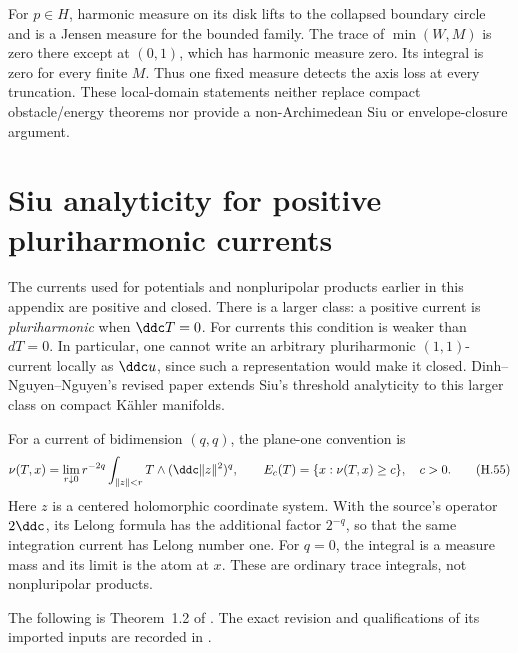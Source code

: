 For $p\in H$, harmonic measure on its disk lifts to the collapsed
boundary circle and is a Jensen measure for the bounded family.
The trace of $\min(W,M)$ is zero there except at $(0,1)$, which has
harmonic measure zero. Its integral is zero for every finite $M$.
Thus one fixed measure detects the axis loss at every truncation.
These local-domain statements neither replace compact obstacle/energy
theorems nor provide a non-Archimedean Siu or envelope-closure argument.

\section{Siu analyticity for positive pluriharmonic currents}
\label{sec:appH-pluriharmonic-Siu}

The currents used for potentials and nonpluripolar products earlier in
this appendix are positive and closed. There is a larger class:
a positive current is \emph{pluriharmonic} when $\ddc T=0$.
For currents this condition is weaker than $dT=0$. In particular,
one cannot write an arbitrary pluriharmonic $(1,1)$-current locally
as $\ddc u$, since such a representation would make it closed.
Dinh--Nguyen--Nguyen's revised paper
\cite{DinhNguyenNguyen26SiuV2} extends Siu's threshold analyticity
to this larger class on compact K\"ahler manifolds.

For a current of bidimension $(q,q)$, the plane-one convention is
\begin{equation*}
 \nu(T,x)=\lim_{r\downarrow0}r^{-2q}
       \int_{\|z\|<r}T\wedge(\ddc\|z\|^2)^q,
 \qquad E_c(T)=\{x:\nu(T,x)\geq c\},\quad c>0.
\tag{H.55}\label{eq:appH-PH-Lelong}
\end{equation*}
Here $z$ is a centered holomorphic coordinate system. With the source's
operator $2\ddc$, its Lelong formula has the additional factor $2^{-q}$,
so that the same integration current has Lelong number one.
For $q=0$, the integral is a measure mass and its limit is the atom
at $x$. These are ordinary trace integrals, not nonpluripolar products.

The following is Theorem~1.2 of
\cite[actual p.~2; proof pp.~11--12]{DinhNguyenNguyen26SiuV2}.
The exact revision and qualifications of its imported inputs are
recorded in .

